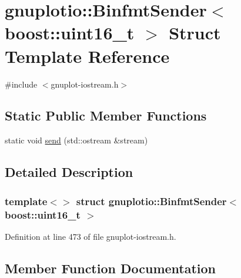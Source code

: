 \hypertarget{structgnuplotio_1_1_binfmt_sender_3_01boost_1_1uint16__t_01_4}{}\section{gnuplotio\+:\+:Binfmt\+Sender$<$ boost\+:\+:uint16\+\_\+t $>$ Struct Template Reference}
\label{structgnuplotio_1_1_binfmt_sender_3_01boost_1_1uint16__t_01_4}


{\ttfamily \#include $<$gnuplot-\/iostream.\+h$>$}

\subsection*{Static Public Member Functions}
\begin{DoxyCompactItemize}
\item 
static void \hyperlink{structgnuplotio_1_1_binfmt_sender_3_01boost_1_1uint16__t_01_4_a7bb7f0a62a21496b9e85ce35f0170717}{send} (std\+::ostream \&stream)
\end{DoxyCompactItemize}


\subsection{Detailed Description}
\subsubsection*{template$<$$>$\newline
struct gnuplotio\+::\+Binfmt\+Sender$<$ boost\+::uint16\+\_\+t $>$}



Definition at line 473 of file gnuplot-\/iostream.\+h.



\subsection{Member Function Documentation}
\mbox{\label{structgnuplotio_1_1_binfmt_sender_3_01boost_1_1uint16__t_01_4_a7bb7f0a62a21496b9e85ce35f0170717}} 
